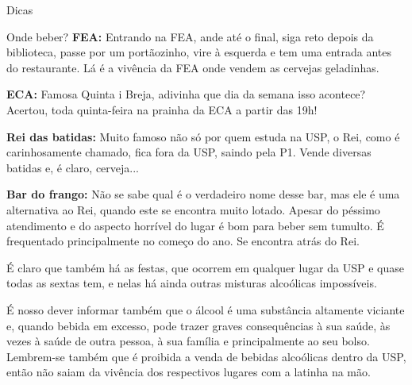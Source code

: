 \begin{secao}{Dicas}
\begin{subsecao}{Onde beber?}
{\bf FEA:} Entrando na FEA, ande até o final, siga reto depois da biblioteca,
passe por um portãozinho, vire à esquerda e tem uma entrada antes do restaurante.
Lá é a vivência da FEA onde vendem as cervejas geladinhas.

{\bf ECA:} Famosa Quinta i Breja, adivinha que dia da semana isso acontece?
Acertou, toda quinta-feira na prainha da ECA a partir das 19h!

{\bf Rei das batidas:} Muito famoso não só por quem estuda na USP, o Rei,
como é carinhosamente chamado, fica fora da USP, saindo pela P1. Vende
diversas batidas e, é claro, cerveja...

{\bf Bar do frango:} Não se sabe qual é o verdadeiro nome desse bar, mas ele é
uma alternativa ao Rei, quando este se encontra muito lotado. Apesar do péssimo atendimento e do aspecto horrível do lugar é bom para beber sem
tumulto. É frequentado principalmente no começo do ano. Se encontra atrás do
Rei.

É claro que também há as festas, que ocorrem em qualquer lugar da USP e quase todas as sextas tem, e nelas
há ainda outras misturas alcoólicas impossíveis.

É nosso dever informar também que o álcool é uma substância altamente viciante
e, quando bebida em excesso, pode trazer graves consequências à sua saúde, às
vezes à saúde de outra pessoa, à sua família e principalmente ao seu bolso.
Lembrem-se também que é proibida a venda de bebidas alcoólicas dentro da USP, então
não saiam da vivência dos respectivos lugares com a latinha na mão.

\end{subsecao}
\end{secao}

